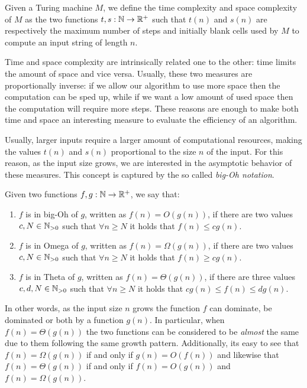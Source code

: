 \begin{definition}
    Given a Turing machine $M$, we define the time complexity and space complexity of $M$ as the two functions $t, s : \mathbb{N} \to \mathbb{R}^+$ such that $t(n)$ and $s(n)$ are respectively the maximum number of steps and initially blank cells used by $M$ to compute an input string of length $n$.
\end{definition}

Time and space complexity are intrinsically related one to the other: time limits the amount of space and vice versa. Usually, these two measures are proportionally inverse: if we allow our algorithm to use more space then the computation can be sped up, while if we want a low amount of used space then the computation will require more steps. These reasons are enough to make both time and space an interesting measure to evaluate the efficiency of an algorithm.

Usually, larger inputs require a larger amount of computational resources, making the values $t(n)$ and $s(n)$ proportional to the size $n$ of the input. For this reason, as the input size grows, we are interested in the asymptotic behavior of these measures. This concept is captured by the so called \textit{big-Oh notation}.

\begin{definition}
    Given two functions $f, g : \mathbb{N} \to \mathbb{R}^+$, we say that:
    \begin{enumerate}
        \item $f$ is in big-Oh of $g$, written as $f(n) = O(g(n))$, if there are two values $c, N \in \mathbb{N}_{> 0}$ such that $\forall n \geq N$ it holds that $f(n) \leq c g(n)$.
        \item $f$ is in Omega of $g$, written as $f(n) = \Omega(g(n))$, if there are two values $c, N \in \mathbb{N}_{> 0}$ such that $\forall n \geq N$ it holds that $f(n) \geq c g(n)$.
        \item $f$ is in Theta of $g$, written as $f(n) = \Theta(g(n))$, if there are three values $c,d, N \in \mathbb{N}_{> 0}$ such that $\forall n \geq N$ it holds that $c g(n) \leq f(n) \leq d g(n)$.
    \end{enumerate}
\end{definition}

\newpage

In other words, as the input size $n$ grows the function $f$ can dominate, be dominated or both by a function $g(n)$. In particular, when $f(n) = \Theta(g(n))$ the two functions can be considered to be \textit{almost} the same due to them following the same growth pattern. Additionally, its easy to see that $f(n) = \Omega(g(n))$ if and only if $g(n) = O(f(n))$ and likewise that $f(n) = \Theta(g(n))$ if and only if $f(n) = O(g(n))$ and $f(n) = \Omega(g(n))$. 

